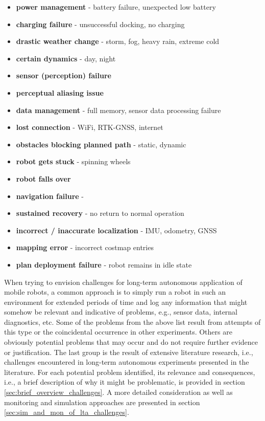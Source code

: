 \documentclass[english, master, utf8]{base/thesis_KBS}
\newcommand{\code}{\collectverb{\codebox}}
\begin{document}
\begin{itemize}
    \item \textbf{power management} - battery failure, unexpected low battery
    \item \textbf{charging failure} - unsuccessful docking, no charging
    \item \textbf{drastic weather change} - storm, fog, heavy rain, extreme cold
    \item \textbf{certain dynamics} - day, night
    \item \textbf{sensor (perception) failure}
    \item \textbf{perceptual aliasing issue}
    \item \textbf{data management} - full memory, sensor data processing failure
    \item \textbf{lost connection} - WiFi, RTK-GNSS, internet
    \item \textbf{obstacles blocking planned path} - static, dynamic
    \item \textbf{robot gets stuck} - spinning wheels
    \item \textbf{robot falls over}
    \item \textbf{navigation failure} - \code{move_base_flex}
    \item \textbf{sustained recovery} - no return to normal operation
    \item \textbf{incorrect / inaccurate localization} - IMU, odometry, GNSS
    \item \textbf{mapping error} - incorrect costmap entries
    \item \textbf{plan deployment failure} - robot remains in idle state
\end{itemize}
When trying to envision challenges for long-term autonomous application of mobile robots, a common approach is to simply run a robot in such an environment for extended periods
of time and log any information that might somehow be relevant and indicative of problems, e.g., sensor data, internal diagnostics, etc. \cite{Biswas:2016}
Some of the problems from the above list result from attempts of this type or the coincidental occurrence in other experiments. Others are obviously potential problems that may occur
and do not require further evidence or justification. The last group is the result of extensive literature research, i.e., challenges encountered in long-term autonomous experiments
presented in the literature. For each potential problem identified, its relevance and consequences, i.e., a brief description of why it might be problematic, is provided in section \ref{sec:brief_overview_challenges}.
A more detailed consideration as well as monitoring and simulation approaches are presented in section \ref{sec:sim_and_mon_of_lta_challenges}.
\end{document}
